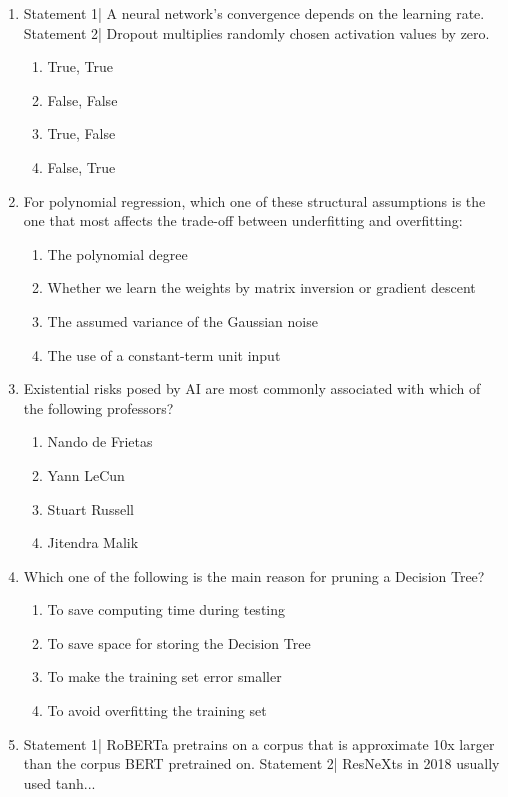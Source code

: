 \documentclass[{\csname fa0013Font0\endcsname\char"0032}{\csname fa0014Font0\endcsname\char"0031}pt]{article}
\begin{document}
\begin{enumerate}[label=\arabic*.]
\begin{enumerate}[label=(\alph*)]
\end{enumerate}
\item Statement 1| A neural network's convergence depends on the learning rate. Statement 2| Dropout multiplies randomly chosen activation values by zero.
\begin{enumerate}[label=(\alph*)]
    \item True, True
    \item False, False
    \item True, False
    \item False, True
\end{enumerate}
\item For polynomial regression, which one of these structural assumptions is the one that most affects the trade-off between underfitting and overfitting:
\begin{enumerate}[label=(\alph*)]
    \item The polynomial degree
    \item Whether we learn the weights by matrix inversion or gradient descent
    \item The assumed variance of the Gaussian noise
    \item The use of a constant-term unit input
\end{enumerate}
\item Existential risks posed by AI are most commonly associated with which of the following professors?
\begin{enumerate}[label=(\alph*)]
    \item Nando de Frietas
    \item Yann LeCun
    \item Stuart Russell
    \item Jitendra Malik
\end{enumerate}
\item Which one of the following is the main reason for pruning a Decision Tree?
\begin{enumerate}[label=(\alph*)]
    \item To save computing time during testing
    \item To save space for storing the Decision Tree
    \item To make the training set error smaller
    \item To avoid overfitting the training set
\end{enumerate}
\item Statement 1| RoBERTa pretrains on a corpus that is approximate 10x larger than the corpus BERT pretrained on. Statement 2| ResNeXts in 2018 usually used tanh...

\end{enumerate}
\end{document}
